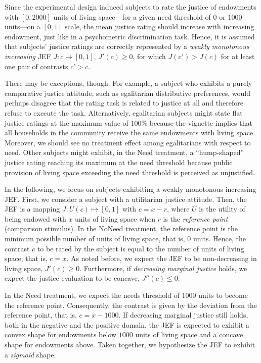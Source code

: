 \documentclass[12pt]{scrartcl}
\begin{document}
Since the experimental design induced subjects to rate the justice of endowments with $[0,2000]$ units of living space---for a given need threshold of $0$ or $1000$ units---on a $[0,1]$ scale, the mean justice rating should increase with increasing endowment, just like in a psychometric discrimination task.
Hence, it is assumed that subjects' justice ratings are correctly represented by a \textit{weakly monotonous increasing} JEF $J:c\mapsto[0,1]$, $J'(c)\ge 0$, for which $J(c')>J(c)$ for at least one pair of contrasts $c'>c$.

There may be exceptions, though.
For example, a subject who exhibits a purely comparative justice attitude, such as egalitarian distributive preferences, would perhaps disagree that the rating task is related to justice at all and therefore refuse to execute the task.
Alternatively, egalitarian subjects might state flat justice ratings at the maximum value of $100\%$ because the vignette implies that all households in the community receive the same endowments with living space.
Moreover, we should see no treatment effect among egalitarians with respect to need.
Other subjects might exhibit, in the Need treatment, a ``hump-shaped'' justice rating reaching its maximum at the need threshold because public provision of living space exceeding the need threshold is perceived as unjustified.

In the following, we focus on subjects exhibiting a weakly monotonous increasing JEF.
First, we consider a subject with a utilitarian justice attitude.
Then, the JEF is a mapping $J:U(c)\mapsto [0,1]$ with $c=x-r$, where $U$ is the utility of being endowed with $x$ units of living space when $r$ is the \textit{reference point} (comparison stimulus).
In the NoNeed treatment, the reference point is the minimum possible number of units of living space, that is, $0$ units.
Hence, the contrast $c$ to be rated by the subject is equal to the number of units of living space, that is, $c=x$.
As noted before, we expect the JEF to be non-decreasing in living space, $J'(c)\ge 0$.
Furthermore, if \textit{decreasing marginal justice} holds, we expect the justice evaluation to be concave, $J''(c)\le 0$.

In the Need treatment, we expect the needs threshold of $1000$ units to become the reference point.
Consequently, the contrast is given by the deviation from the reference point, that is, $c=x-1000$.
If decreasing marginal justice still holds, both in the negative and the positive domain, the JEF is expected to exhibit a convex shape for endowments below $1000$ units of living space and a concave shape for endowments above.
Taken together, we hypothesize the JEF to exhibit a \textit{sigmoid} shape.
\end{document}
